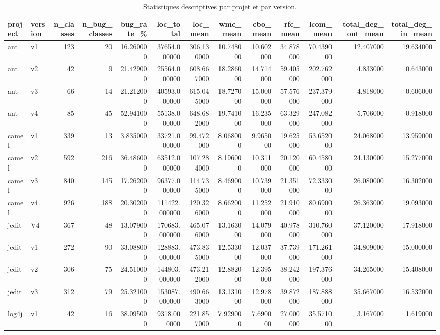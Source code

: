 \begin{table}
\caption{Statistiques descriptives par projet et par version.}
\label{tab:project_version_stats}
\begin{tabular}{llrrrrrrrrrrr}
\toprule
project & version & n\_classes & n\_bug\_classes & bug\_rate\_\% & loc\_total & loc\_mean & wmc\_mean & cbo\_mean & rfc\_mean & lcom\_mean & total\_deg\_out\_mean & total\_deg\_in\_mean \\
\midrule
ant & v1 & 123 & 20 & 16.260000 & 37654.000000 & 306.130000 & 10.748000 & 10.602000 & 34.878000 & 70.439000 & 12.407000 & 19.634000 \\
ant & v2 & 42 & 9 & 21.429000 & 25564.000000 & 608.667000 & 18.286000 & 14.714000 & 59.405000 & 202.762000 & 4.833000 & 0.643000 \\
ant & v3 & 66 & 14 & 21.212000 & 40593.000000 & 615.045000 & 18.727000 & 15.000000 & 57.576000 & 237.379000 & 4.818000 & 0.606000 \\
ant & v4 & 85 & 45 & 52.941000 & 55138.000000 & 648.682000 & 19.741000 & 16.235000 & 63.329000 & 247.082000 & 5.706000 & 0.918000 \\
camel & v1 & 339 & 13 & 3.835000 & 33721.000000 & 99.472000 & 8.068000 & 9.965000 & 19.625000 & 53.652000 & 24.068000 & 13.959000 \\
camel & v2 & 592 & 216 & 36.486000 & 63512.000000 & 107.284000 & 8.196000 & 10.311000 & 20.120000 & 60.458000 & 24.130000 & 15.277000 \\
camel & v3 & 840 & 145 & 17.262000 & 96377.000000 & 114.735000 & 8.469000 & 10.739000 & 21.351000 & 72.333000 & 26.080000 & 16.302000 \\
camel & v4 & 926 & 188 & 20.302000 & 111422.000000 & 120.326000 & 8.662000 & 11.252000 & 21.910000 & 80.690000 & 26.363000 & 19.093000 \\
jedit & V4 & 367 & 48 & 13.079000 & 170683.000000 & 465.076000 & 13.163000 & 14.079000 & 40.978000 & 310.760000 & 37.120000 & 17.918000 \\
jedit & v1 & 272 & 90 & 33.088000 & 128883.000000 & 473.835000 & 12.533000 & 12.037000 & 37.739000 & 171.261000 & 34.809000 & 15.000000 \\
jedit & v2 & 306 & 75 & 24.510000 & 144803.000000 & 473.212000 & 12.882000 & 12.395000 & 38.242000 & 197.376000 & 34.265000 & 15.408000 \\
jedit & v3 & 312 & 79 & 25.321000 & 153087.000000 & 490.663000 & 13.131000 & 12.978000 & 39.872000 & 187.888000 & 35.667000 & 16.532000 \\
log4j & v1 & 42 & 16 & 38.095000 & 9318.000000 & 221.857000 & 7.929000 & 7.690000 & 27.000000 & 35.571000 & 3.167000 & 1.619000 \\

\end{tabular}
\end{table}
